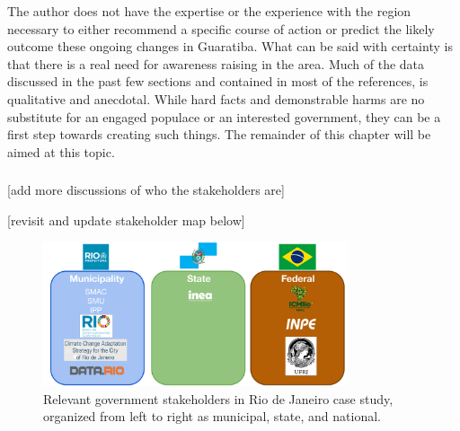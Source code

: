 The author does not have the expertise or the experience with the region necessary to either recommend a specific course of action or predict the likely outcome these ongoing changes in Guaratiba. What can be said with certainty is that there is a real need for awareness raising in the area. Much of the data discussed in the past few sections and contained in most of the references, is qualitative and anecdotal. While hard facts and demonstrable harms are no substitute for an engaged populace or an interested government, they can be a first step towards creating such things. The remainder of this chapter will be aimed at this topic.

\subsubsection{}

[add more discussions of who the stakeholders are]

[revisit and update stakeholder map below]

\begin{figure}[H] 
\centering
\includegraphics[width=0.8\textwidth]{Figures/chap4/government-agencies.png}
\caption[Relevant government stakeholders in Rio de Janeiro case study]{Relevant government stakeholders in Rio de Janeiro case study, organized from left to right as municipal, state, and national.}
\label{fig:government-agencies}
\end{figure}

